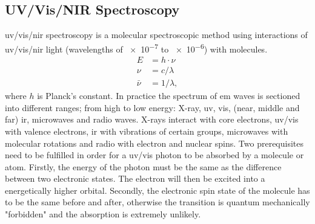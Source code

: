 \subsection{UV/Vis/NIR Spectroscopy}
\Gls{uv}/\gls{vis}/\gls{nir} spectroscopy is a molecular spectroscopic method using 
interactions of \gls{uv}/\gls{vis}/\gls{nir} light 
(wavelengths of \num{e-7} to \num{e-6}\m{}) with molecules\cite{Schwedt2008}.
\begin{align*}
	E &= h \cdot \nu \\
	\nu &= c/ \lambda \\
	\bar{\nu} &= 1/\lambda,
\end{align*}
where $h$ is Planck's constant.
In practice the spectrum of \gls{em} waves is sectioned into different ranges; %
from high to low energy: X-ray, \gls{uv}, \gls{vis}, (near, middle and far) \gls{ir}, microwaves and radio waves. 
X-rays interact with core electrons, \gls{uv}/\gls{vis} with valence electrons, \gls{ir} with 
vibrations of certain groups, microwaves with molecular rotations and radio with electron and nuclear spins. 
%
Two prerequisites need to be fulfilled in order for a \gls{uv}/\gls{vis} photon to be 
absorbed by a molecule or atom.
Firstly, the energy of the photon must be the same as the difference between two electronic states. %
The electron will then be excited into a energetically higher orbital.
Secondly, the electronic spin state of the molecule has to be the same before and after, otherwise the transition is quantum mechanically "forbidden" and the absorption is extremely unlikely. 

